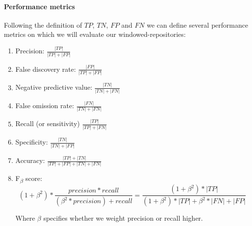 \documentclass[12pt,twoside,notitlepage]{report}
\begin{document}
\paragraph{Performance metrics}Following the definition of $TP$, $TN$, $FP$ and $FN$ we can define several performance metrics on which we will evaluate our windowed-repositories\cite{IR}:
\begin{enumerate}[label=(\alph*)]
\item Precision: $\frac{|TP|}{|TP| + |FP|}$
\item False discovery rate: $\frac{|FP|}{|TP| + |FP|}$
\item Negative predictive value: $\frac{|TN|}{|TN| + |FN|}$
\item False omission rate: $\frac{|FN|}{|TN| + |FN|}$
\item Recall (or sensitivity) $\frac{|TP|}{|TP| + |FN|}$ 
\item Specificity: $\frac{|TN|}{|TN| + |FP|}$
\item Accuracy: $\frac{|TP| + |TN|}{|TP| + |FP| + |TN| + |FN|}$
\item F\textsubscript{$\beta$} score: \[(1+\beta^2)*\frac{precision*recall}{(\beta^2*precision)+recall} = \frac{(1+\beta^2)*|TP|}{(1+\beta^2)*|TP| + \beta^2*|FN| + |FP|}\]

Where $\beta$ specifies whether we weight precision or recall higher.
\end{enumerate}
\end{document}
